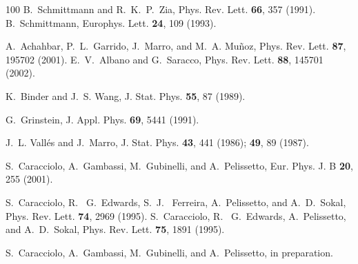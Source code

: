 \documentclass[aps,prl,twocolumn,floatfix,amssymb]{revtex4}
\begin{document}
\begin{thebibliography}{100}
B.~Schmittmann and R.~K.~P.~Zia, 
Phys. Rev. Lett. {\bf 66}, 357 (1991). 
B.~Schmittmann, 
Europhys. Lett. {\bf 24}, 109 (1993). 
 
A.~Achahbar, P.~L.~Garrido, J.~Marro, and M.~A. Mu{\~n}oz, 
Phys. Rev. Lett. {\bf 87}, 195702 (2001). 
E.~V.~Albano and G.~Saracco, Phys. Rev. Lett. {\bf 88}, 145701 (2002). 
 
K.~Binder and J.~S. Wang, 
\newblock J. Stat. Phys. {\bf 55}, 87 (1989). 
 
G.~Grinstein, 
\newblock J. Appl. Phys. {\bf 69}, 5441 (1991). 
 
J.~L. Vall\'es and J.~Marro, 
\newblock J. Stat. Phys. {\bf 43}, 441 (1986); 
{\bf 49}, 89 (1987). 
 
S.~Caracciolo, A.~Gambassi, M.~Gubinelli, and A.~Pelissetto, 
Eur. Phys. J. B {\bf 20}, 255 (2001). 
 
S.~Caracciolo, R.~ G.~Edwards, S.~J.~ Ferreira, A.~Pelissetto, and 
A.~D.~Sokal, 
Phys. Rev. Lett. {\bf 74}, 2969 (1995). 
S.~Caracciolo, R.~ G.~Edwards, A.~Pelissetto, and A.~D.~Sokal, 
\newblock Phys. Rev. Lett. {\bf 75}, 1891 (1995). 
 
S.~Caracciolo, A.~Gambassi, M.~Gubinelli, and A.~Pelissetto, 
in preparation. 
 
 
\end{thebibliography} 
 
 
\end{document}
